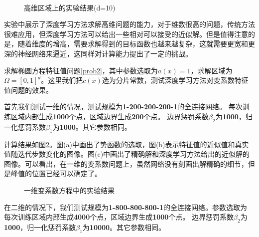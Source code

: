 \begin{figure}[h]
\centering
{}
\\
\caption{高维区域上的实验结果(d=10)}
\label{f3}
\end{figure}

实验中展示了深度学习方法求解高维问题的能力，对于维数很高的问题，传统方法很难应用，但深度学习方法可以给出一些相对可以接受的近似解。但是值得注意的是，随着维度的增高，需要求解得到的目标函数也越来越复杂，这就需要更宽和更深的神经网络来逼近，这同样对计算能力提出了一定的挑战。


求解椭圆方程特征值问题\ref{prob2}，其中参数选取为$a(x)=1$，求解区域为$\Omega = [0, 1]^d$。这里我们把$c(x)$选为分片常数，测试深度学习方法对变系数特征值问题的效果。


首先我们测试一维的情况，测试规模为\textbf{1-200-200-200-1}的全连接网络。
每次训练区域内部生成\textbf{1000}个点，区域边界生成\textbf{200}个点。
边界惩罚系数$\beta_2$为\textbf{1000}，归一化惩罚系数$\beta_1$为\textbf{1000}。其它参数相同。

计算结果如图\ref{fb1}。图(a)中画出了势函数的选取，图(b)表示特征值的近似值和真实值随迭代步数变化的图像。图(c)中画出了精确解和深度学习方法给出的近似解的图像。可以看出，在一维的变系数问题上，虽然网络没有刻画出解精确的细节，但是峰值的位置已经可以确定了。

\begin{figure}[h]
\centering
{}
\caption{一维变系数方程中的实验结果}
\label{fb1}
\end{figure}


在二维的情况下，我们测试规模为\textbf{1-800-800-800-1}的全连接网络。参数选取为
每次训练区域内部生成\textbf{4000}个点，区域边界生成\textbf{1000}个点。
边界惩罚系数$\beta_2$为\textbf{1000}，归一化惩罚系数$\beta_1$为\textbf{10000}。其它参数相同。

